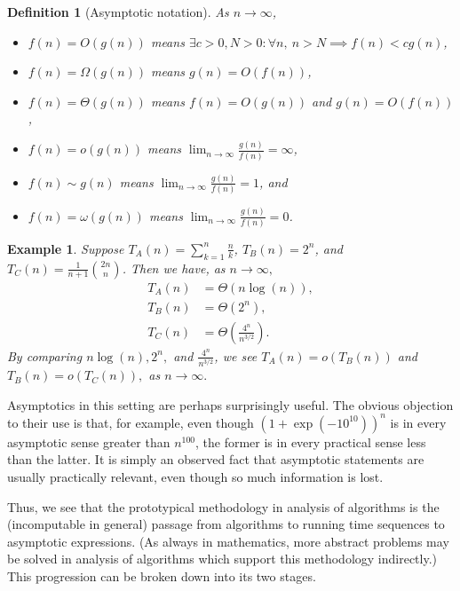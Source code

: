 \documentclass{article}
\theoremstyle{plain}
\newtheorem{defin}{Definition}
\newtheorem{exa}{Example}
\begin{document}
\begin{defin}[Asymptotic notation]
  As \( n \rightarrow \infty \),
  \begin{itemize}
    \item \( f(n) = O(g(n)) \) means
      \( \exists c > 0, N > 0 : \forall n, \ n > N \implies f(n) < c g(n) \),
    \item \( f(n) = \Omega(g(n)) \) means \( g(n) = O(f(n)) \),
    \item \( f(n) = \Theta(g(n)) \) means \( f(n) = O(g(n)) \) and
      \( g(n) = O(f(n)) \),
    \item \( f(n) = o(g(n)) \) means
      \( \lim_{n \rightarrow \infty} \frac{g(n)}{f(n)} = \infty \),
    \item \( f(n) \sim g(n) \) means
      \( \lim_{n \rightarrow \infty} \frac{g(n)}{f(n)} = 1 \), and
    \item \( f(n) = \omega(g(n)) \) means
      \( \lim_{n \rightarrow \infty} \frac{g(n)}{f(n)} = 0 \).
  \end{itemize}
\end{defin}

\begin{exa}

  Suppose \( T_A(n) =  \sum_{k=1}^n \frac{n}{k} \),
  \( T_B(n) = 2^n \), and
  \( T_C(n) = \frac{1}{n+1} \binom{2n}{n} \).
  Then we have, as \( n \rightarrow \infty, \)
  \begin{align*}
    T_A(n) &= \Theta(n \log(n)), \\
    T_B(n) &= \Theta(2^n), \\
    T_C(n) &= \Theta \left( \frac{4^n}{n^{3/2}} \right).
  \end{align*}
  By comparing \(  n \log(n), 2^n, \) and \( \frac{4^n}{n^{3/2} } \),
  we see \( T_A(n) = o(T_B(n)) \) and \( T_B(n) = o(T_C(n)), \) as \(n
  \rightarrow \infty. \)

\end{exa}

Asymptotics in this setting are perhaps surprisingly useful.
The obvious objection to their use is that, for example, even though
\( (1 + \exp(-10^{10}))^n \) is in every asymptotic sense greater than
\( n^{100} \), the former is in every practical sense less than the latter.
It is simply an observed fact that asymptotic statements are usually
practically relevant, even though so much information is lost.

Thus, we see that the prototypical methodology in analysis of algorithms is
the (incomputable in general) passage from algorithms to running
time sequences to asymptotic expressions.
(As always in mathematics, more abstract problems may be solved in analysis
of algorithms which support this methodology indirectly.)
This progression can be broken down into its two stages.
\end{document}
